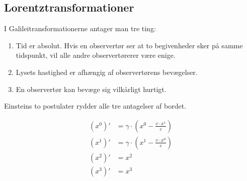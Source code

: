 \documentclass[crop=false, class=memoir]{standalone}
\begin{document}
\subsection{Lorentztransformationer} %
I Galileitransformationerne antager man tre ting:
%
\begin{enumerate}
    \item Tid er absolut. Hvis en observertør ser at to begivenheder sker på samme tidspunkt, vil alle andre observertørerer være enige.
     \item Lysets hastighed er afhængig af observertørens bevægelser.
     \item En observertør kan bevæge sig vilkårligt hurtigt.
\end{enumerate}
%
Einsteins to postulater rydder alle tre antagelser af bordet.











\begin{subequations}
\begin{align}
    \left(x^0\right)' &= \gamma \cdot \left(x^0 - \frac{v \cdot  x^1}{c}\right) \label{rel:eq:lorx0} \\
    \left(x^1\right)' &= \gamma \cdot \left(x^1 - \frac{v\cdot x^0}{c}\right) \label{rel:eq:lorx1}\\
    \left(x^2\right)' &= x^2 \\
    \left(x^3\right)' &= x^3 
\end{align}
\label{rel:eq:lorentrans}
\end{subequations}
\end{document}
